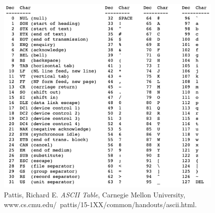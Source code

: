 \documentclass[a4paper,12pt]{article}
\theoremstyle{definition}
\begin{document}
\begin{figure}[!htb]
	\captionsetup{labelformat=empty}
     \caption{Pattis, Richard E. \textit{ASCII Table}, Carnegie Mellon University, www.cs.cmu.edu/~pattis/15-1XX/common/handouts/ascii.html.}
	 \centering
     \includegraphics[width=\linewidth]{ascii}
\end{figure}
\end{document}
